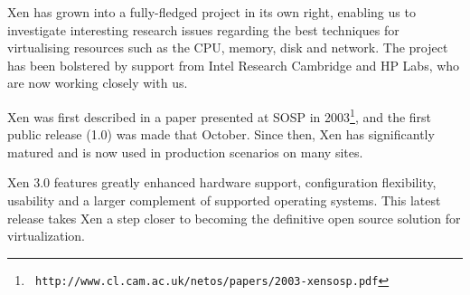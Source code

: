 Xen has grown into a fully-fledged project in its own right, enabling
us to investigate interesting research issues regarding the best
techniques for virtualising resources such as the CPU, memory, disk
and network.  The project has been bolstered by support from Intel
Research Cambridge and HP Labs, who are now working closely with us.

Xen was first described in a paper presented at SOSP in
2003\footnote{\tt
  http://www.cl.cam.ac.uk/netos/papers/2003-xensosp.pdf}, and the
first public release (1.0) was made that October.  Since then, Xen has
significantly matured and is now used in production scenarios on many
sites.

Xen 3.0 features greatly enhanced hardware support, configuration
flexibility, usability and a larger complement of supported operating
systems. This latest release takes Xen a step closer to becoming the
definitive open source solution for virtualization.
